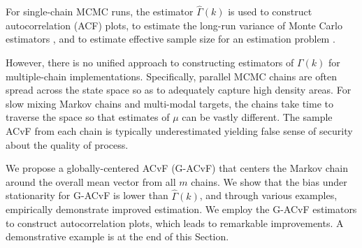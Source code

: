 \documentclass[11pt]{article}
\theoremstyle{remark}
\begin{document}
For single-chain MCMC runs, the estimator $\hat{\Gamma}(k)$ is used to construct autocorrelation (ACF) plots, to estimate the long-run variance of Monte Carlo estimators \cite{hannan:1970,dame:1991}, and to estimate effective sample size for an estimation problem \cite{kass:carlin:gelman:neal:1998,gong:fleg:2016,vats:fleg:jon:2019}. 

However, there is no unified approach to constructing estimators of $\Gamma(k)$ for multiple-chain implementations. Specifically, parallel MCMC chains are often spread across the state space so as to adequately capture high density areas. For slow mixing Markov chains and multi-modal targets, the chains take time to traverse the space so that estimates of $\mu$ can be vastly different. The sample ACvF from each chain is typically underestimated yielding false sense of security about the quality of process.


 We propose a globally-centered ACvF (G-ACvF) that centers the Markov chain around the overall mean vector from all $m$ chains. We show that the bias under stationarity for G-ACvF is lower than $\hat{\Gamma}(k)$, and through various examples, empirically demonstrate improved estimation. We employ the G-ACvF estimators to construct autocorrelation plots, which leads to remarkable improvements. A demonstrative example is at the end of this Section. 
\end{document}
